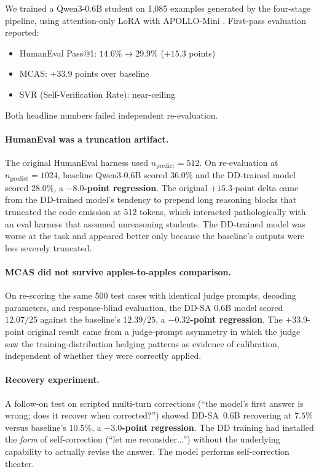 \documentclass[11pt,a4paper]{article}
\begin{document}
We trained a Qwen3-0.6B student on 1,085 examples generated by the four-stage pipeline, using attention-only LoRA \cite{hu2022lora} with APOLLO-Mini \cite{zhu2024apollo}. First-pass evaluation reported:

\begin{itemize}[leftmargin=*]
\item HumanEval Pass@1: $14.6\% \to 29.9\%$ ($+15.3$ points)
\item MCAS: $+33.9$ points over baseline
\item SVR (Self-Verification Rate): near-ceiling
\end{itemize}

Both headline numbers failed independent re-evaluation.

\paragraph{HumanEval was a truncation artifact.} The original HumanEval harness used $n_{\text{predict}}{=}512$. On re-evaluation at $n_{\text{predict}}{=}1024$, baseline Qwen3-0.6B scored $36.0\%$ and the DD-trained model scored $28.0\%$, a \textbf{$-8.0$-point regression}. The original $+15.3$-point delta came from the DD-trained model's tendency to prepend long reasoning blocks that truncated the code emission at 512 tokens, which interacted pathologically with an eval harness that assumed unreasoning students. The DD-trained model was worse at the task and appeared better only because the baseline's outputs were less severely truncated.

\paragraph{MCAS did not survive apples-to-apples comparison.} On re-scoring the same 500 test cases with identical judge prompts, decoding parameters, and response-blind evaluation, the DD-SA 0.6B model scored $12.07/25$ against the baseline's $12.39/25$, a \textbf{$-0.32$-point regression}. The $+33.9$-point original result came from a judge-prompt asymmetry in which the judge saw the training-distribution hedging patterns as evidence of calibration, independent of whether they were correctly applied.

\paragraph{Recovery experiment.} A follow-on test on scripted multi-turn corrections (``the model's first answer is wrong; does it recover when corrected?'') showed DD-SA~0.6B recovering at $7.5\%$ versus baseline's $10.5\%$, a \textbf{$-3.0$-point regression}. The DD training had installed the \emph{form} of self-correction (``let me reconsider...'') without the underlying capability to actually revise the answer. The model performs self-correction theater.
\end{document}
